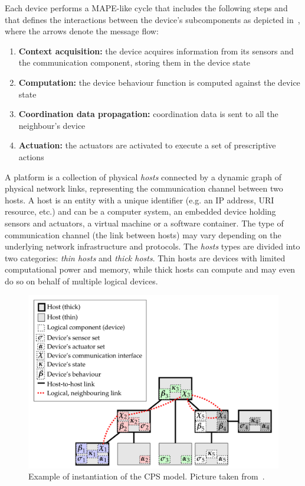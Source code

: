 Each device performs a MAPE-like cycle that includes the following steps and that defines the interactions between the device's subcomponents as
depicted in~, where the arrows denote the message flow:

\begin{enumerate}
	\item \textbf{Context acquisition:} the device acquires information from its sensors and the communication component, storing them in the device
	      state
	\item \textbf{Computation:} the device behaviour function is computed against the device state
	\item \textbf{Coordination data propagation:} coordination data is sent to all the neighbour's device
	\item \textbf{Actuation:} the actuators are activated to execute a set of prescriptive actions
\end{enumerate}

A platform is a collection of physical \emph{hosts} connected by a dynamic graph of physical network links, representing the communication channel
between two hosts. A host is an entity with a unique identifier (e.g. an IP address, URI resource, etc.) and can be a computer system, an embedded
device holding sensors and actuators, a virtual machine or a software container. The type of communication channel (the link between hosts) may
vary depending on the underlying network infrastructure and protocols.
The \emph{hosts} types are divided into two categories: \emph{thin hosts} and \emph{thick hosts}. Thin hosts are devices with limited computational
power and memory, while thick hosts can compute and may even do so on behalf of multiple logical devices.

\begin{figure}[ht]
	\centering
	\includegraphics[width=0.7\linewidth]{figures/cps-example.png}
	\caption[Instantiation example of the CPS model]{Example of instantiation of the CPS model. Picture taken from~\cite{fi12110203}.}
	\label{fig:cps-example}
\end{figure}

